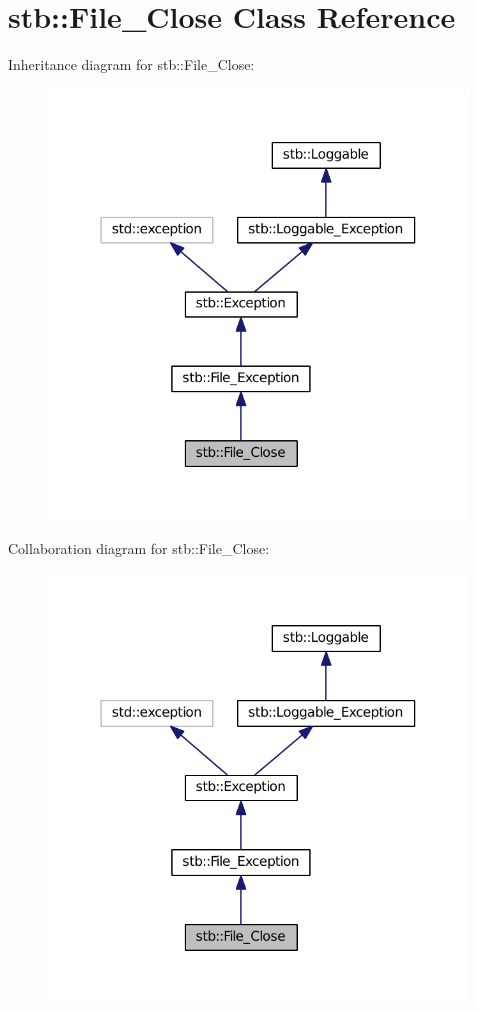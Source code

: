 \hypertarget{classstb_1_1File__Close}{\section{stb\+:\+:File\+\_\+\+Close Class Reference}
\label{classstb_1_1File__Close}
}


Inheritance diagram for stb\+:\+:File\+\_\+\+Close\+:
\nopagebreak
\begin{figure}[H]
\begin{center}
\leavevmode
\includegraphics[width=316pt]{classstb_1_1File__Close__inherit__graph}
\end{center}
\end{figure}


Collaboration diagram for stb\+:\+:File\+\_\+\+Close\+:
\nopagebreak
\begin{figure}[H]
\begin{center}
\leavevmode
\includegraphics[width=316pt]{classstb_1_1File__Close__coll__graph}
\end{center}
\end{figure}
